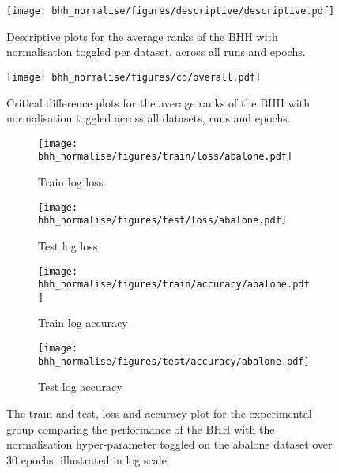 \begin{figure}[htbp]
	\centering
	\texttt{[image: bhh\_normalise/figures/descriptive/descriptive.pdf]}
	\caption{Descriptive plots for the average ranks of the \acs{BHH} with normalisation toggled per dataset, across all runs and epochs.}
	\label{fig:results:normalise:descriptive:descriptive}
\end{figure}

\begin{figure}[htbp]
	\centering
	\texttt{[image: bhh\_normalise/figures/cd/overall.pdf]}
	\caption{Critical difference plots for the average ranks of the \acs{BHH} with normalisation toggled across all datasets, runs and epochs.}
	\label{fig:results:normalise:descriptive:cd}
\end{figure}


\begin{figure}[htbp]
	\begin{subfigure}{0.5\textwidth}
		\centering
		\texttt{[image: bhh\_normalise/figures/train/loss/abalone.pdf]}
		\caption{Train log loss}
		\label{fig:results:normalise:figures:loss:train:abalone}
	\end{subfigure}
	\begin{subfigure}{0.5\textwidth}
		\centering
		\texttt{[image: bhh\_normalise/figures/test/loss/abalone.pdf]}
		\caption{Test log loss}
		\label{fig:results:normalise:figures:loss:test:abalone}
	\end{subfigure}
	\par\bigskip
	\begin{subfigure}{0.5\textwidth}
		\centering
		\texttt{[image: bhh\_normalise/figures/train/accuracy/abalone.pdf]}
		\caption{Train log accuracy}
		\label{fig:results:normalise:figures:accuracy:train:abalone}
	\end{subfigure}
	\begin{subfigure}{0.5\textwidth}
		\centering
		\texttt{[image: bhh\_normalise/figures/test/accuracy/abalone.pdf]}
		\caption{Test log accuracy}
		\label{fig:results:normalise:figures:accuracy:test:abalone}
	\end{subfigure}
	\par\bigskip
	\caption{The train and test, loss and accuracy plot for the experimental group comparing the performance of the \acs{BHH} with the normalisation hyper-parameter toggled on the abalone dataset over 30 epochs, illustrated in log scale.}
	\label{fig:results:normalise:figures:abalone}
\end{figure}



